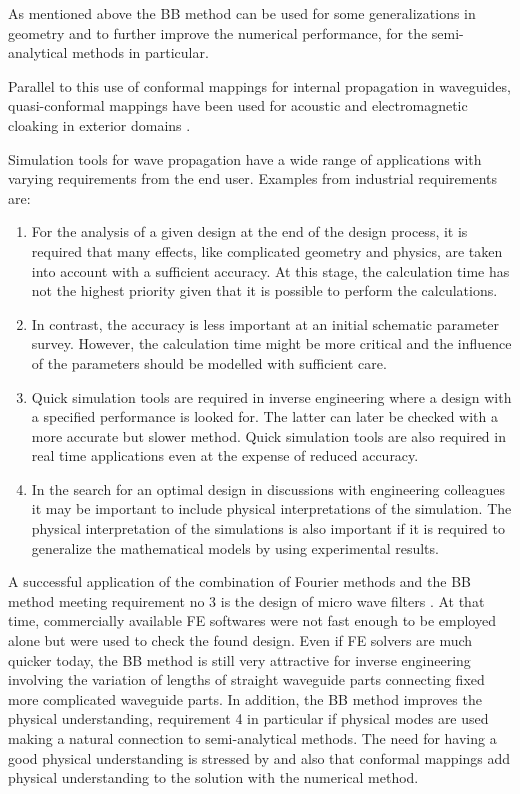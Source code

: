 \documentclass[numreferences]{kluwer}
\begin{document}
As mentioned above the BB method can be used for some generalizations
in geometry and to further improve the numerical performance, for the
semi-analytical methods in particular.

Parallel to this use of conformal mappings for internal propagation in
waveguides, quasi-conformal mappings have been used for acoustic and
electromagnetic cloaking in exterior domains
\cite{pendryschurigsmith2006}.

Simulation tools for wave propagation have a wide range of
applications with varying requirements from the end user. Examples
from industrial requirements are:
\begin{enumerate}
\item For the analysis of a given design at the end of the design
  process, it is required that many effects, like complicated geometry
  and physics, are taken into account with a sufficient accuracy. At
  this stage, the calculation time has not the highest priority given
  that it is possible to perform the calculations.
\item In contrast, the accuracy is less important at an initial
  schematic parameter survey. However, the calculation time might be
  more critical and the influence of the parameters should be modelled
  with sufficient care.
\item Quick simulation tools are required in inverse engineering where
  a design with a specified performance is looked for. The latter can
  later be checked with a more accurate but slower method. Quick
  simulation tools are also required in real time applications even at
  the expense of reduced accuracy.
\item In the search for an optimal design in discussions with
  engineering colleagues it may be important to include physical
  interpretations of the simulation. The physical interpretation of
  the simulations is also important if it is required to generalize
  the mathematical models by using experimental results.

\end{enumerate}

A successful application of the combination of Fourier methods and the
BB method meeting requirement no 3 is the design of micro wave filters
\cite{bironilsson2005}. At that time, commercially available FE
softwares were not fast enough to be employed alone but were used to
check the found design. Even if FE solvers are much quicker today, the
BB method is still very attractive for inverse engineering involving
the variation of lengths of straight waveguide parts connecting fixed
more complicated waveguide parts. In addition, the BB method improves
the physical understanding, requirement 4 in particular if physical
modes are used making a natural connection to semi-analytical
methods. The need for having a good physical understanding is stressed
by \cite{nachbin+daSilvaSimoes:2012} and also that conformal mappings
add physical understanding to the solution with the numerical method.
\end{document}
